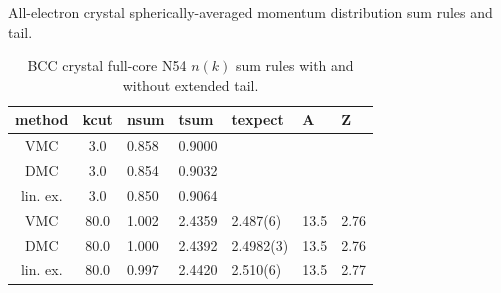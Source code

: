 \documentclass[aps,prl,superscriptaddress]{revtex4-1}
\newcommand{\midrule}{\hline}
\newcommand{\bottomrule}{\hline\hline}
\begin{document}
\begin{table}[h]
\caption{All-electron crystal spherically-averaged momentum distribution sum rules and tail. \label{tab:fc-ntsum}}
\begin{subtable}{0.49\textwidth}
\caption{BCC crystal full-core N54 $n(k)$ sum rules with and without extended tail.\label{tab:solid-bare-n54-sum02}}
\begin{tabular}{cclllll}
\toprule
method & kcut & nsum & tsum & texpect & A & Z \\
\midrule
VMC & 3.0 & 0.858 & 0.9000 \\
DMC & 3.0 & 0.854 & 0.9032 \\
lin. ex. & 3.0 & 0.850 & 0.9064 \\
VMC & 80.0 & 1.002 & 2.4359 & 2.487(6) & 13.5 & 2.76 \\
DMC & 80.0 & 1.000 & 2.4392 & 2.4982(3) & 13.5 & 2.76 \\
lin. ex. & 80.0 & 0.997 & 2.4420 & 2.510(6) & 13.5 & 2.77 \\
\bottomrule
\end{tabular}
\end{subtable}
\end{table}



\end{document}
